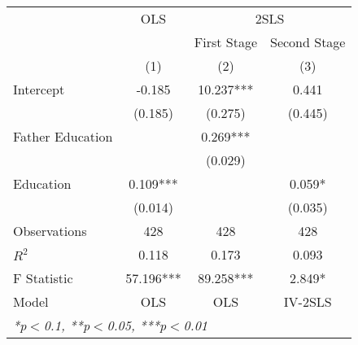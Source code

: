 

\begin{tabular}{lccc}
  \toprule
  \toprule
  & \multicolumn{1}{c}{OLS} & \multicolumn{2}{c}{2SLS} \\
  \cmidrule(lr){2-2}\cmidrule(lr){3-4}
  & \multicolumn{1}{c}{} & \multicolumn{1}{c}{First Stage} & \multicolumn{1}{c}{Second Stage} \\
   &   (1) & (2) & (3)\\
  \midrule
  Intercept & -0.185 & 10.237*** & 0.441 \\
   & (0.185) & (0.275) & (0.445) \\
  Father Education &  & 0.269*** &  \\
   &  & (0.029) &  \\
  Education & 0.109*** &  & 0.059* \\
   & (0.014) &  & (0.035) \\
  \midrule
  Observations & 428 & 428 & 428 \\
  $R^2$ & 0.118 & 0.173 & 0.093 \\
  F Statistic & 57.196*** & 89.258*** & 2.849* \\
  Model & OLS & OLS & IV-2SLS \\
  \bottomrule
  \multicolumn{4}{l}{{\small \textit{*p$<$0.1, **p$<$0.05, ***p$<$0.01}}}\\
\end{tabular}
